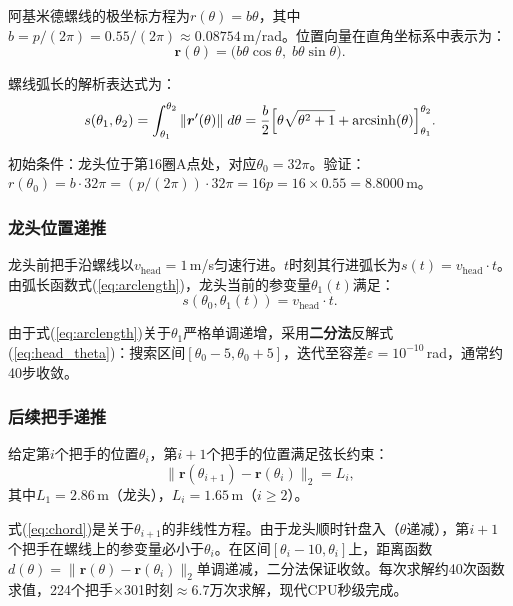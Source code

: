 \documentclass[12pt]{ctexart}
\begin{document}
阿基米德螺线的极坐标方程为$r(\theta)=b\theta$，其中$b=p/(2\pi)=0.55/(2\pi)\approx 0.08754$\,m/rad。位置向量在直角坐标系中表示为：
\begin{equation}
\bm{r}(\theta) = \bigl(b\theta\cos\theta,\; b\theta\sin\theta\bigr).
\label{eq:spiral}
\end{equation}

螺线弧长的解析表达式为：
\begin{equation}
s(\theta_1,\theta_2) = \int_{\theta_1}^{\theta_2}\|\bm{r}'(\theta)\|\;d\theta
= \frac{b}{2}\Bigl[\theta\sqrt{\theta^2+1}+\operatorname{arcsinh}(\theta)\Bigr]_{\theta_1}^{\theta_2}.
\label{eq:arclength}
\end{equation}

初始条件：龙头位于第16圈A点处，对应$\theta_0=32\pi$。验证：$r(\theta_0)=b\cdot 32\pi = (p/(2\pi))\cdot 32\pi = 16p = 16\times 0.55 = 8.8000$\,m。

\subsubsection{龙头位置递推}

龙头前把手沿螺线以$v_{\text{head}}=1$\,m/s匀速行进。$t$时刻其行进弧长为$s(t)=v_{\text{head}}\cdot t$。由弧长函数式(\ref{eq:arclength})，龙头当前的参变量$\theta_1(t)$满足：
\begin{equation}
s(\theta_0,\theta_1(t)) = v_{\text{head}}\cdot t.
\label{eq:head_theta}
\end{equation}

由于式(\ref{eq:arclength})关于$\theta_1$严格单调递增，采用\textbf{二分法}反解式(\ref{eq:head_theta})：搜索区间$[\theta_0-5,\theta_0+5]$，迭代至容差$\varepsilon=10^{-10}$\,rad，通常约40步收敛。

\subsubsection{后续把手递推}

给定第$i$个把手的位置$\theta_i$，第$i+1$个把手的位置满足弦长约束：
\begin{equation}
\|\bm{r}(\theta_{i+1}) - \bm{r}(\theta_i)\|_2 = L_i,
\label{eq:chord}
\end{equation}
其中$L_1=2.86$\,m（龙头），$L_i=1.65$\,m（$i\ge 2$）。

式(\ref{eq:chord})是关于$\theta_{i+1}$的非线性方程。由于龙头顺时针盘入（$\theta$递减），第$i+1$个把手在螺线上的参变量必小于$\theta_i$。在区间$[\theta_i-10,\theta_i]$上，距离函数$d(\theta)=\|\bm{r}(\theta)-\bm{r}(\theta_i)\|_2$单调递减，二分法保证收敛。每次求解约40次函数求值，224个把手$\times$301时刻$\approx 6.7$万次求解，现代CPU秒级完成。
\end{document}
